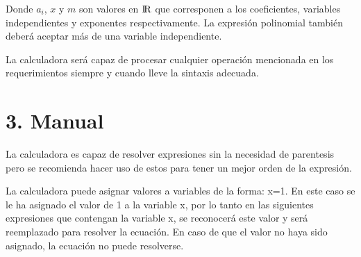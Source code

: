 \documentclass[10pt]{report}
\begin{document}
Donde $a_i$, $x$ y $m$ son valores en ${\rm I\!R}$ que corresponen a los coeficientes, variables independientes y exponentes respectivamente. La expresión polinomial también deberá aceptar más de una variable independiente.

La calculadora será capaz de procesar cualquier operación mencionada en los requerimientos siempre y cuando lleve la sintaxis adecuada.

\section*{3. Manual}
La calculadora es capaz de resolver expresiones sin la necesidad de parentesis pero se recomienda hacer uso de estos para tener un mejor orden de la expresión.

La calculadora puede asignar valores a variables de la forma: x=1. En este caso se le ha asignado el valor de 1 a la variable x, por lo tanto en las siguientes expresiones que contengan la variable x, se reconocerá este valor y será reemplazado para resolver la ecuación. En caso de que el valor no haya sido asignado, la ecuación no puede resolverse.
\end{document}
